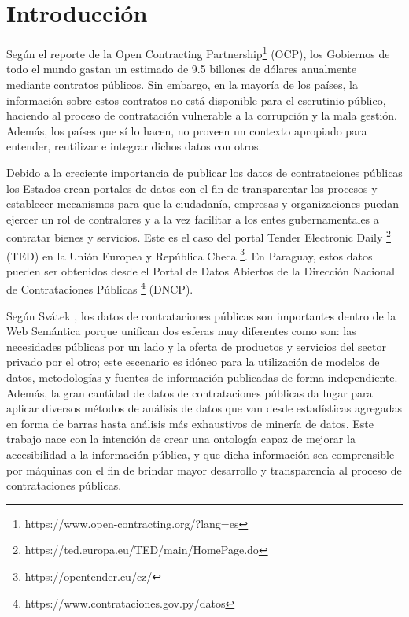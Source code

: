 \chapter{Introducción}
\label{chap:introduccion}
Según el reporte de la Open Contracting Partnership\footnote{https://www.open-contracting.org/?lang=es} (OCP), los Gobiernos de todo el mundo gastan un estimado de 9.5 billones de dólares anualmente mediante contratos públicos. Sin embargo, en la mayoría de los países, la información sobre estos contratos no está disponible para el escrutinio público, haciendo al proceso de contratación vulnerable a la corrupción y la mala gestión. Además, los países que sí lo hacen, no proveen un contexto apropiado para entender, reutilizar e integrar dichos datos con otros.

Debido a la creciente importancia de publicar los datos de contrataciones públicas los Estados crean portales de datos con el fin de transparentar los procesos y establecer mecanismos para que la ciudadanía, empresas y organizaciones puedan ejercer un rol de contralores y a la vez facilitar a los entes gubernamentales a contratar bienes y servicios. Este es el caso del portal Tender Electronic Daily \footnote{https://ted.europa.eu/TED/main/HomePage.do} (TED) en la Unión Europea y República Checa \footnote{https://opentender.eu/cz/}. En Paraguay, estos datos pueden ser obtenidos desde el Portal de Datos Abiertos de la Dirección Nacional de Contrataciones Públicas \footnote{https://www.contrataciones.gov.py/datos} (DNCP).


Según Svátek \cite{svatek2014linked}, los datos de contrataciones públicas son importantes dentro de la Web Semántica \cite{Semantic20:online} porque unifican dos esferas muy diferentes como son: las necesidades públicas por un lado y la oferta de productos y servicios del sector privado por el otro; este escenario es idóneo para la utilización de modelos de datos, metodologías y fuentes de información publicadas de forma independiente. Además, la gran cantidad de datos de contrataciones públicas da lugar para aplicar diversos métodos de análisis de datos que van desde estadísticas agregadas en forma de barras hasta análisis más exhaustivos de minería de datos.
Este trabajo nace con la intención de crear una ontología capaz de mejorar la accesibilidad a la información pública, y que dicha información sea comprensible por máquinas con el fin de brindar mayor desarrollo y transparencia al proceso de contrataciones públicas. 



